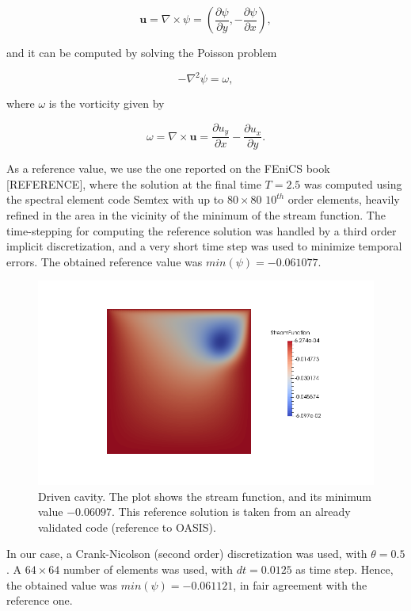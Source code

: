 \documentclass[a4paper,11pt,openright,twoside]{book}
\begin{document}
\[
\mathbf{u} = \nabla \times \psi = (\frac{\partial \psi}{\partial y} , - \frac{\partial \psi }{\partial x}),
\]

and it can be computed by solving the Poisson problem

\[
- \nabla^2 \psi = \omega,
\]

where $\omega$ is the vorticity given by

\[
\omega = \nabla \times \mathbf{u} = \frac{\partial u_y}{\partial x} - \frac{\partial u_x}{\partial y}.
\]


As a reference value, we use the one reported on the FEniCS book [REFERENCE], where the solution at the final time $T = 2.5$ was computed using the spectral element code Semtex with up to $80 \times 80$ $10^{th}$ order elements, heavily refined in the area in the vicinity of the minimum of the stream function. The time-stepping for computing the reference solution was handled by a third order implicit discretization, and a very short time step was used to minimize temporal errors.  The obtained reference value was $min(\psi) = -0.061 077$.

\begin{figure}[ht]
\centering
\includegraphics[width=\textwidth]{images/oyvind.png}
\vspace{-1cm}
\caption{Driven cavity. The plot shows the stream function, and its minimum value $-0.06097$. This reference solution is taken from an already validated code (reference to OASIS).}
\end{figure}


In our case, a Crank-Nicolson (second order) discretization was used, with $\theta = 0.5$. A $64 \times 64$ number of elements was used, with $dt = 0.0125$ as time step. Hence, the obtained value was $min(\psi) = -0.061 121$, in fair agreement with the reference one. \\
\end{document}

